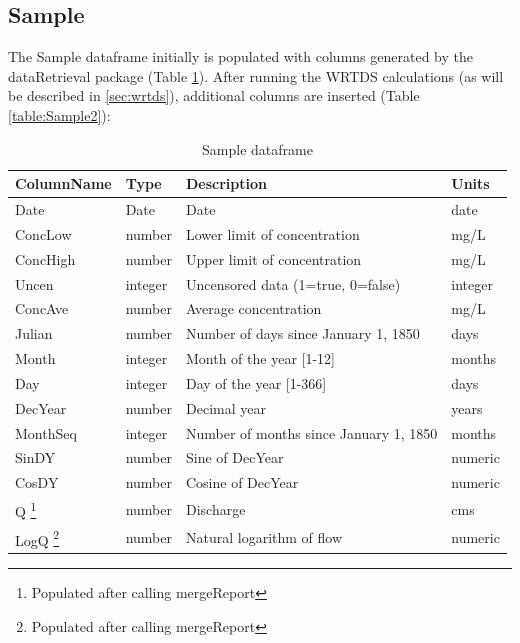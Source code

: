 \documentclass[a4paper,11pt]{article}
\begin{document}
\FloatBarrier

\subsection{Sample}
\label{sec:dataframesSample}
The Sample dataframe initially is populated with columns generated by the dataRetrieval package (Table \ref{table:Sample1}). After running the WRTDS calculations (as will be described in \ref{sec:wrtds}), additional columns are inserted (Table \ref{table:Sample2}):

\begin{table}[!ht]
\begin{minipage}{\linewidth}
\centering
\caption{Sample dataframe} 
\label{table:Sample1}
\begin{tabular}{llll}
  \hline
ColumnName & Type & Description & Units \\ 
  \hline
Date & Date & Date & date \\ 
  ConcLow & number & Lower limit of concentration & mg/L \\ 
  ConcHigh & number & Upper limit of concentration & mg/L \\ 
  Uncen & integer & Uncensored data (1=true, 0=false) & integer \\ 
  ConcAve & number & Average concentration & mg/L \\ 
  Julian & number & Number of days since January 1, 1850 & days \\ 
  Month & integer & Month of the year [1-12] & months \\ 
  Day & integer & Day of the year [1-366] & days \\ 
  DecYear & number & Decimal year & years \\ 
  MonthSeq & integer & Number of months since January 1, 1850 & months \\ 
  SinDY & number & Sine of DecYear & numeric \\ 
  CosDY & number & Cosine of DecYear & numeric \\ 
  Q \footnote{Populated after calling mergeReport} & number & Discharge & cms \\ 
  LogQ \footnote{Populated after calling mergeReport} & number & Natural logarithm of flow & numeric \\ 
   \hline
\end{tabular}
\end{minipage}
\end{table}
\end{document}
